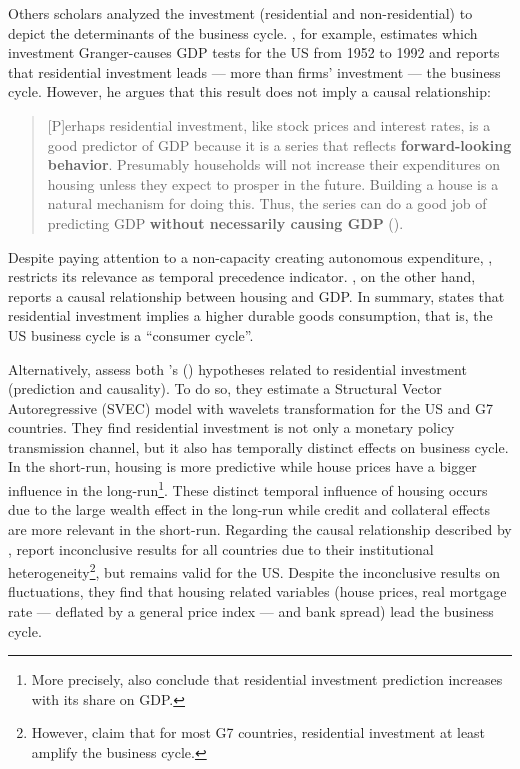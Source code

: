 \documentclass[11pt]{article}
\begin{document}
Others scholars analyzed the investment (residential and non-residential) to depict the determinants of the business cycle.
\textcite{green_follow_1997}, for example, estimates which investment Granger-causes GDP tests for the US from 1952 to 1992 and reports that residential investment leads --- more than firms' investment --- the business cycle.
However, he argues that this result does not imply a causal relationship: 

\begin{quote}
[P]erhaps residential investment, like stock prices and interest rates, is a good predictor of GDP because it is a series that reflects \textbf{forward-looking behavior}. Presumably households will not increase their expenditures on housing unless they expect to prosper in the future. Building a house is a natural mechanism for doing this. Thus, the series can do a good job of predicting GDP \textbf{without necessarily causing GDP} (\cite[p.~267, ephasis added]{green_follow_1997}).
\end{quote}


Despite paying attention to a non-capacity creating autonomous expenditure, \textcite{green_follow_1997}, restricts its relevance as temporal precedence indicator.
\textcite{leamer_housing_2007}, on the other hand, reports a causal relationship between housing and GDP.
In summary, states that residential investment implies a higher durable goods consumption, that is, the US business cycle is a ``consumer cycle''.

Alternatively, \textcite{huang_is_2018} assess both \citeauthor{leamer_housing_2007}'s (\citeyear{leamer_housing_2007}) hypotheses related to residential investment (prediction and causality). 
To do so, they estimate a Structural Vector Autoregressive (SVEC) model with wavelets transformation for the US and G7 countries.
They find residential investment is not only a monetary policy transmission channel, but it also has temporally distinct effects on business cycle.
In the short-run, housing is more predictive while house prices have a bigger influence in the long-run\footnote{More precisely, \textcite{huang_is_2018} also conclude that residential investment prediction increases with its share on GDP.}. 
These distinct temporal influence of housing occurs due to the large wealth effect in the long-run while credit and collateral effects are more relevant in the short-run.
Regarding the causal relationship described by \textcite{leamer_housing_2007}, 
\textcite{huang_is_2018} report inconclusive results for all countries due to their institutional heterogeneity\footnote{However, \textcite{huang_is_2018} claim that for most G7 countries, residential investment at least amplify the business cycle.}, but remains valid for the US.
Despite the inconclusive results on fluctuations, they find that housing related variables (house prices, real mortgage rate --- deflated by a general price index --- and bank spread) lead the business cycle.
\end{document}

